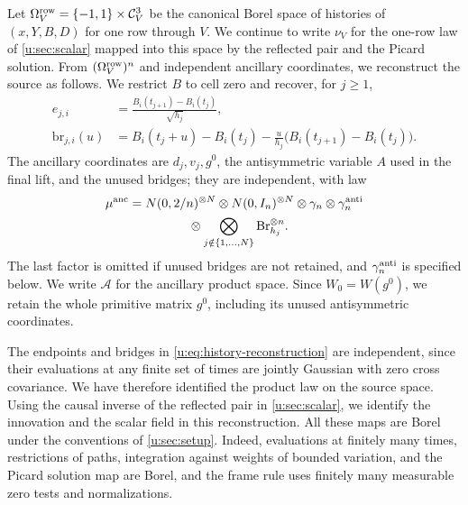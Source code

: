Let $\Omega^{\rm row}_V=\{-1,1\}\times\mathcal C_V^3$ be the
canonical Borel space of histories of $(x,Y,B,D)$ for one row through
$V$.
We continue to write $\nu_V$ for the one-row law of
\cref{u:sec:scalar} mapped into this space by the reflected pair and
the Picard solution. From $(\Omega^{\rm row}_V)^n$ and independent
ancillary coordinates, we reconstruct the source as follows. We
restrict $B$ to cell zero and recover, for $j\ge1$,
\begin{equation}\label{u:eq:history-reconstruction}
 \begin{aligned}
 e_{j,i}&=\frac{B_i(t_{j+1})-B_i(t_j)}{\sqrt{h_j}},\\
 \mathrm{br}_{j,i}(u)&=B_i(t_j+u)-B_i(t_j)
          -\frac{u}{h_j}\bigl(B_i(t_{j+1})-B_i(t_j)\bigr).
 \end{aligned}
\end{equation}
The ancillary coordinates are $d_j,v_j,g^0$, the antisymmetric variable
$A$ used in the final lift, and the unused bridges; they are independent, with law
\begin{equation}\label{u:eq:ancillary-law}
 \begin{aligned}
 \mu^{\rm anc}={}&N(0,2/n)^{\otimes N}\otimes N(0,I_n)^{\otimes N}
                  \otimes\gamma_n\otimes\gamma_n^{\rm anti}\\
 &\hspace{12mm}\otimes
       \bigotimes_{j\notin\{1,\ldots,N\}}
                     \mathrm{Br}_{h_j}^{\otimes n}.
 \end{aligned}
\end{equation}
The last factor is omitted if unused bridges are not retained, and
$\gamma_n^{\rm anti}$ is specified below. We write $\mathcal A$ for
the ancillary product space. Since $W_0=W(g^0)$, we retain the whole primitive matrix $g^0$,
including its unused antisymmetric coordinates.

The endpoints and bridges in \eqref{u:eq:history-reconstruction} are
independent, since their evaluations at any finite set of times are jointly
Gaussian with zero cross covariance. We have therefore identified
the product law on the source space. Using the causal
inverse of the reflected pair in \cref{u:sec:scalar}, we identify the
innovation and the scalar field in this reconstruction. All these maps are Borel
under the conventions of \cref{u:sec:setup}. Indeed, evaluations at finitely many times,
restrictions of paths, integration against weights of bounded variation, and
the Picard solution map are Borel,
and the frame rule uses finitely many measurable zero tests and
normalizations.

